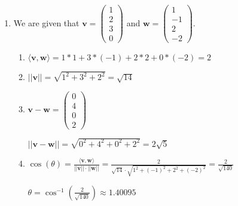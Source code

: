 \documentclass[12pt]{article}
\begin{document}
\begin{enumerate}[leftmargin=0em]
\begin{proof}
    \noindent Finally, for any $f,g,h \in C[a,b]$ and $c_{1},c_{2}\in \RR$, by the linearity of the Riemann integral, we have that
    \[\langle c_{1}f(x)+c_{2}g(x), h(x)\rangle = \int_{a}^{b} (c_{1}f(x)+c_{2}g(x))h(x)\, dx\, = \int_{a}^{b} (c_{1}f(x)h(x)+c_{2}g(x)h(x))\, dx\,\] 
    \[= c_{1}\int_{a}^{b} f(x)h(x)\, dx\, +c_{2}\int_{a}^{b} g(x)h(x)\, dx\, = c_{1}\langle f,h\rangle+c_{2} \langle g , h\rangle.\]
    Therefore, $\langle \cdot, \cdot \rangle$ is an inner product, which is the desired result. 
  \end{proof}
  
  \item
  We are given that $\mathbf{v} = \begin{pmatrix}
    1\\
    2\\
    3\\
    0
  \end{pmatrix}$ and
  $\mathbf{w} = \begin{pmatrix}
    1\\
    -1\\
    2\\
    -2
  \end{pmatrix}$.
  \begin{enumerate}[leftmargin=!]
    \item $\langle \mathbf{v} , \mathbf{w} \rangle = 1 * 1 + 3 * (-1) + 2 * 2 + 0 * (-2) = 2$

    \item $||\mathbf{v}|| = \sqrt{1^{2} + 3^{2} + 2^{2}} = \sqrt{14}$

    \item $\mathbf{v} - \mathbf{w} = \begin{pmatrix}
      0 \\
      4 \\
      0 \\
      2
    \end{pmatrix}$

    $||\mathbf{v} - \mathbf{w}|| = \sqrt{0^{2} + 4^{2} + 0^{2} + 2^{2}} = 2\sqrt{5}$

    \item $\cos(\theta) = \frac{\langle \mathbf{v}, \mathbf{w} \rangle}{||\mathbf{v}||\cdot||\mathbf{w}||} = \frac{2}{\sqrt{14} \cdot \sqrt{1^{2} + (-1)^{2} + 2^{2} + (-2)^{2}}} = \frac{2}{\sqrt{140}}$ 
    
    $\theta = \cos^{-1}(\frac{2}{\sqrt{140}}) \approx 1.40095$
  \end{enumerate}



\end{enumerate}
\end{document}
